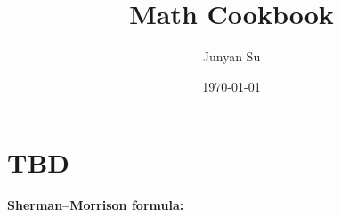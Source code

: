 \documentclass{article}
\title{Math Cookbook}
\author{Junyan Su}
\date{\today}
\begin{document}
\maketitle

\section{TBD}
\textbf{Sherman–Morrison formula:}
\end{document}
